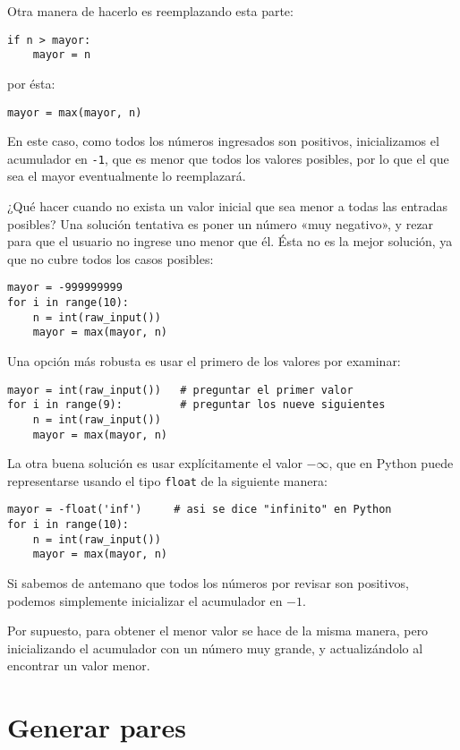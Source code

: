 Otra manera de hacerlo es reemplazando esta parte:
\begin{lstlisting}
if n > mayor:
    mayor = n
\end{lstlisting}
por ésta:
\begin{lstlisting}
mayor = max(mayor, n)
\end{lstlisting}

En este caso, como todos los números ingresados son positivos,
inicializamos el acumulador en \lstinline!-1!, que es menor que todos
los valores posibles, por lo que el que sea el mayor eventualmente lo
reemplazará.

¿Qué hacer cuando no exista un valor inicial que sea menor a todas las
entradas posibles? Una solución tentativa es poner un número «muy negativo», y
rezar para que el usuario no ingrese uno menor que él. Ésta no es la
mejor solución, ya que no cubre todos los casos posibles:

\begin{lstlisting}
mayor = -999999999
for i in range(10):
    n = int(raw_input())
    mayor = max(mayor, n)
\end{lstlisting}

Una opción más robusta es usar el primero de los valores por examinar:

\begin{lstlisting}
mayor = int(raw_input())   # preguntar el primer valor
for i in range(9):         # preguntar los nueve siguientes
    n = int(raw_input())
    mayor = max(mayor, n)
\end{lstlisting}

La otra buena solución es usar explícitamente el valor \(-\infty\), que en
Python puede representarse usando el tipo \lstinline!float! de la
siguiente manera:

\begin{lstlisting}
mayor = -float('inf')     # asi se dice "infinito" en Python
for i in range(10):
    n = int(raw_input())
    mayor = max(mayor, n)
\end{lstlisting}

Si sabemos de antemano que todos los números por revisar son positivos,
podemos simplemente inicializar el acumulador en \(-1\).

Por supuesto, para obtener el menor valor se hace de la misma manera,
pero inicializando el acumulador con un número muy grande, y
actualizándolo al encontrar un valor menor.

\section{Generar pares}

